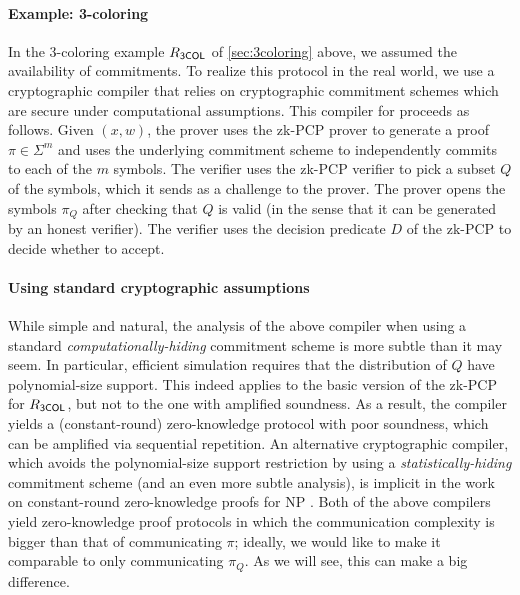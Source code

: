 \paragraph{\bf Example: 3-coloring}
In the 3-coloring example  $R_{\sf 3COL}$ of \cref{sec:3coloring} above, we assumed the availability of commitments.
To realize this protocol in the real world, we use a cryptographic compiler that relies on cryptographic commitment schemes which are secure under computational assumptions. 
This compiler for  proceeds as follows. Given $(x,w)$, the prover uses the zk-PCP prover to generate a proof $\pi\in\Sigma^m$ and uses the underlying commitment scheme to independently commits to each of the $m$ symbols. 
The verifier uses the zk-PCP verifier to pick a subset $Q$ of the symbols, which it sends as a challenge to the prover. 
The prover opens the symbols $\pi_Q$ after checking that $Q$ is valid (in the sense that it can be generated by an honest verifier). The verifier uses the decision predicate $D$ of the zk-PCP to decide whether to accept. 

\paragraph{Using standard cryptographic assumptions}
While simple and natural, the analysis of the above compiler when using a standard {\em computationally-hiding} commitment scheme \cite{2001:Gol:FOC-vol1} is more subtle than it may seem. 
In particular, efficient simulation requires that the distribution of $Q$ have polynomial-size support. 
This indeed applies to the basic version of the zk-PCP for $R_{\sf 3COL}$, but not to the one with amplified soundness. 
As a result, the compiler yields a (constant-round) zero-knowledge protocol with poor soundness, which can be amplified via sequential repetition. 
An alternative cryptographic compiler, which avoids the polynomial-size support restriction by using a {\em statistically-hiding} commitment scheme (and an even more subtle analysis), is implicit in the work on constant-round zero-knowledge proofs for NP \cite{1996:GK:how-to}. 
Both of the above compilers yield zero-knowledge proof protocols in which the communication complexity is bigger than that of communicating $\pi$; ideally, we would like to make it comparable to only communicating $\pi_Q$. 
As we will see, this can make a big difference. 
\loosen

